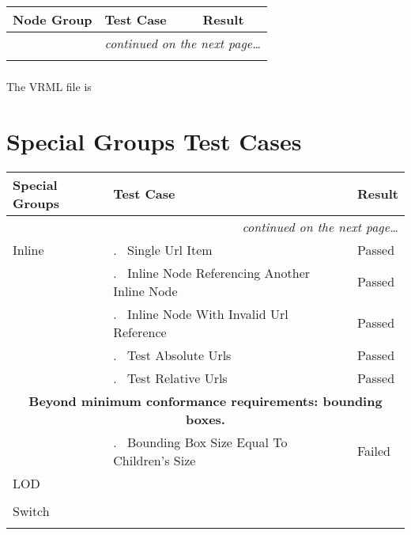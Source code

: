 \documentclass[12pt,letterpaper]{article}
\newcounter{testCaseCtr}
\newcommand{\testCase}{\arabic{testCaseCtr}.~ \stepcounter{testCaseCtr}}
\newcommand{\resetTestCase}{\setcounter{testCaseCtr}{1}}
\newcommand{\SpGrA}{Single Url Item}
\newcommand{\SpGrB}{Inline Node Referencing Another Inline Node}
\newcommand{\SpGrC}{Inline Node With Invalid Url Reference}
\newcommand{\SpGrD}{Test Absolute Urls}
\newcommand{\SpGrE}{Test Relative Urls}
\newcommand{\SpGrF}{Bounding Box Size Equal To Children's Size}
\begin{document}
\begin{center}
\setlongtables
\begin{longtable}{|l|l|l|}
\hline
\textbf{Node Group} & \textbf{Test Case} & \textbf{Result} \\
\hline\hline
\endhead
 & \multicolumn{2}{|r|}{\textsl{continued on the next page\ldots}} \\
\hline
\endfoot
\hline
\endlastfoot
& & \\
\cline{2-3}
\end{longtable}
\end{center}

\subsubsection{}
The VRML file is 

\section{Special Groups Test Cases}
\resetTestCase

\begin{center}
\setlongtables
\begin{longtable}{|l|l|l|}
\hline
\textbf{Special Groups} & \textbf{Test Case} & \textbf{Result} \\
\hline\hline
\endhead
 & \multicolumn{2}{|r|}{\textsl{continued on the next page\ldots}} \\
\hline
\endfoot
\hline
\endlastfoot
Inline & \testCase \SpGrA & Passed \\\cline{2-3}
& \testCase \SpGrB & Passed \\\cline{2-3}
& \testCase \SpGrC & Passed \\\cline{2-3}
& \testCase \SpGrD & Passed \\\cline{2-3}
& \testCase \SpGrE & Passed \\\hline
\multicolumn{3}{|c|}{\textbf{Beyond minimum conformance requirements:
bounding boxes.}} \\\hline
& \testCase \SpGrF & Failed \\\hline
\resetTestCase
LOD & & \\\cline{2-3}
& & \\\hline
\resetTestCase
Switch & & \\\cline{2-3}
& & \\
\end{longtable}
\end{center}
\end{document}
